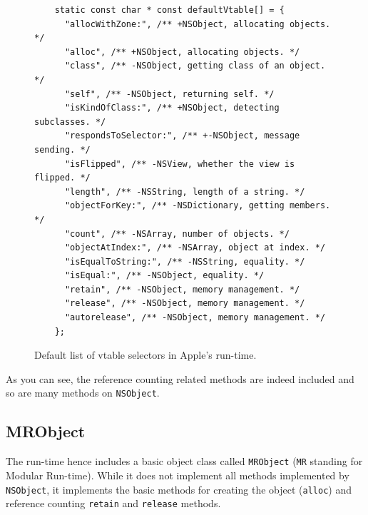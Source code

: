 \begin{figure}[H]
  \begin{verbatim}
    static const char * const defaultVtable[] = {
      "allocWithZone:", /** +NSObject, allocating objects. */
      "alloc", /** +NSObject, allocating objects. */
      "class", /** -NSObject, getting class of an object. */
      "self", /** -NSObject, returning self. */
      "isKindOfClass:", /** +NSObject, detecting subclasses. */
      "respondsToSelector:", /** +-NSObject, message sending. */
      "isFlipped", /** -NSView, whether the view is flipped. */
      "length", /** -NSString, length of a string. */
      "objectForKey:", /** -NSDictionary, getting members. */
      "count", /** -NSArray, number of objects. */
      "objectAtIndex:", /** -NSArray, object at index. */
      "isEqualToString:", /** -NSString, equality. */
      "isEqual:", /** -NSObject, equality. */
      "retain", /** -NSObject, memory management. */
      "release", /** -NSObject, memory management. */ 
      "autorelease", /** -NSObject, memory management. */
    };
  \end{verbatim}
  \centering{}
  \caption{Default list of vtable selectors in Apple's run-time.}
  \label{fig:vtable_def_sels}
\end{figure}

As you can see, the reference counting related methods are indeed included and so are many methods on \verb=NSObject=.

\subsection{MRObject}

The run-time hence includes a basic object class called \verb=MRObject= (\verb=MR= standing for Modular Run-time). While it does not implement all methods implemented by \verb=NSObject=, it implements the basic methods for creating the object (\verb=alloc=) and reference counting \verb=retain= and \verb=release= methods.

